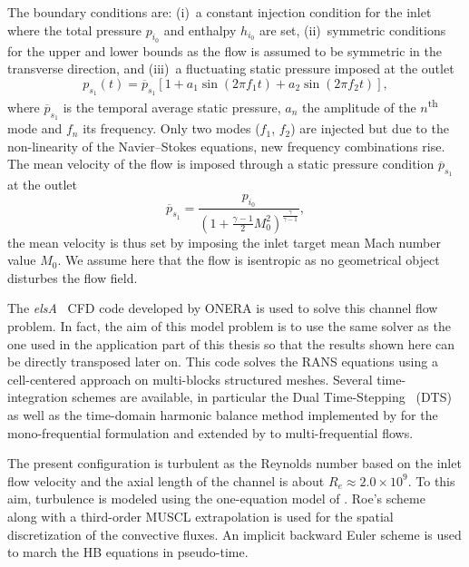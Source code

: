 The boundary conditions are: (i)~a constant injection condition for the inlet
where the total pressure $p_{i_0}$ and enthalpy $h_{i_0}$ are set,
(ii)~symmetric conditions for the upper and lower bounds as the flow
is assumed to be symmetric in the transverse direction, and (iii)~a
fluctuating static pressure imposed at the outlet
\begin{equation}
  p_{s_1}(t) = \overline{p}_{s_1} \left[1 + a_1 \sin(2 \pi f_1 t) +
    a_2 \sin(2 \pi f_2 t) \right],
  \label{eq:outlet_canal}
\end{equation}
where $\overline{p}_{s_1}$ is the temporal average static pressure, $a_n$ the
amplitude of the $n$\textsuperscript{th} mode and $f_n$ its
frequency. Only two modes ($f_1$, $f_2$) are injected
but due to the non-linearity of the Navier--Stokes equations,
new frequency combinations rise.
The mean velocity of the flow is imposed through a
static pressure condition $\overline{p}_{s_1}$ at the outlet
\begin{equation}
    \overline{p}_{s_1} = \frac{p_{i_0}}{\left(1 + 
    \frac{\gamma - 1}{2} M_{0}^2 \right) ^ {\frac{\gamma}{ \gamma - 1}}} ,
\end{equation}
the mean velocity is thus set by imposing the
inlet target mean Mach number value $M_{0}$.
We assume here that the flow is isentropic as no
geometrical object disturbes the flow field.

The \textit{elsA}~\cite{Cambier2013} CFD code developed by ONERA
is used to solve this channel flow problem. In fact, 
the aim of this model problem is 
to use the same
solver as the one used in the application part of this
thesis so that the results shown here can be directly
transposed later on.
This code solves the RANS equations using a cell-centered
approach on multi-blocks structured meshes.
Several time-integration schemes
are available, in particular the Dual Time-Stepping~\cite{Jameson1981} (DTS)
as well as the time-domain harmonic 
balance method implemented by \citet{JSicot2008} for the mono-frequential
formulation and extended by \citet{JGuedeney2013} to multi-frequential flows. 


The present configuration is turbulent as the Reynolds number based on the
inlet flow velocity and the axial length of the channel is about $R_e
\approx 2.0 \times 10^9$. To this aim, turbulence is modeled using the
one-equation model of \citet{Spalart1992}.
Roe's scheme~\cite{Roe1981} along with a third-order MUSCL extrapolation 
is used for the spatial discretization of
the convective fluxes. An implicit backward Euler scheme is used
to march the HB equations in pseudo-time.

